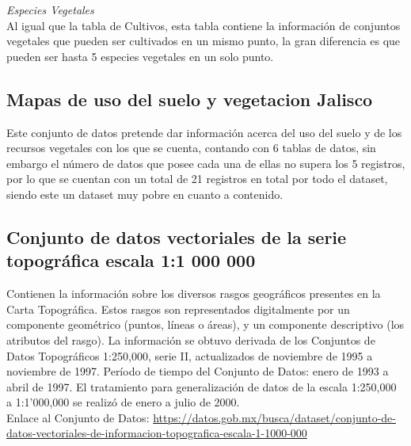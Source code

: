 \documentclass[10pt,letterpaper]{article}
\begin{document}
\textit{Especies Vegetales}\\
Al igual que la tabla de Cultivos, esta tabla contiene la informaci\'on de conjuntos vegetales que pueden ser cultivados en un mismo punto, la gran diferencia es que pueden ser hasta 5 especies vegetales en un solo punto.

\subsection{Mapas de uso del suelo y vegetacion Jalisco}

Este conjunto de datos pretende dar informaci\'on acerca del uso del suelo y de los recursos vegetales con los que se cuenta, contando con 6 tablas de datos, sin embargo el n\'umero de datos que posee cada una de ellas no supera los 5 registros, por lo que se cuentan con un total de 21 registros en total por todo el dataset, siendo este un dataset muy pobre en cuanto a contenido.

%
%

\subsection{Conjunto de datos vectoriales de la serie topográfica escala 1:1 000 000}

Contienen la información sobre los diversos rasgos geográficos presentes en la Carta Topográfica. Estos rasgos son representados digitalmente por un componente geométrico (puntos, líneas o áreas), y un componente descriptivo (los atributos del rasgo). La información se obtuvo derivada de los Conjuntos de Datos Topográficos 1:250,000, serie II, actualizados de noviembre de 1995 a noviembre de 1997. Período de tiempo del Conjunto de Datos: enero de 1993 a abril de 1997. El tratamiento para generalización de datos de la escala 1:250,000 a 1:1'000,000 se realizó de enero a julio de 2000.\\

Enlace al Conjunto de Datos: 
\url{https://datos.gob.mx/busca/dataset/conjunto-de-datos-vectoriales-de-informacion-topografica-escala-1-1000-000}
\end{document}
